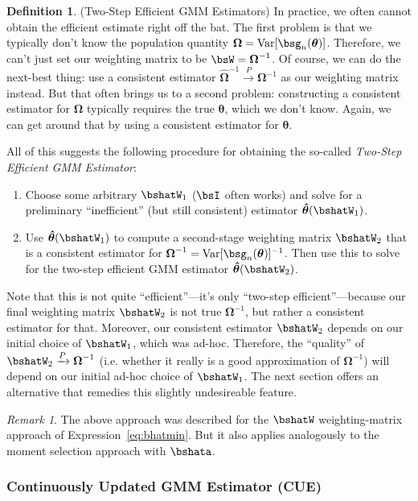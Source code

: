 \documentclass[12pt]{article}
\theoremstyle{plain}
\theoremstyle{definition}
\newtheorem{defn}[thm]{Definition}
\theoremstyle{remark}
\newtheorem*{rmk}{Remark}
\newcommand{\bstheta}{\boldsymbol{\theta}}
\newcommand{\bsOmega}{\boldsymbol{\Omega}}
\newcommand{\bshattheta}{\boldsymbol{\hat{\theta}}}
\newcommand{\bshatOmega}{\boldsymbol{\hat{\Omega}}}
\newcommand{\Var}{\operatorname{Var}}
\newcommand{\pto}{\xrightarrow{P}}
\begin{document}
\begin{defn}(Two-Step Efficient GMM Estimators)
In practice, we often cannot obtain the efficient estimate right off the
bat.
The first problem is that we typically don't know the population
quantity $\bsOmega=\Var[\bsg_n(\bstheta)]$. Therefore, we
can't just set our weighting matrix to be $\bsW=\bsOmega^{-1}$.
Of course, we can do the next-best thing: use a consistent estimator
$\bshatOmega^{-1}\pto\bsOmega^{-1}$ as our weighting matrix instead. But
that often brings us to a second problem: constructing a consistent
estimator for $\bsOmega$ typically requires the true $\bstheta$, which
we don't know. Again, we can get around that by using a consistent
estimator for $\bstheta$.

All of this suggests the following procedure for obtaining the
so-called \emph{Two-Step Efficient GMM Estimator}:
\begin{enumerate}
  \item Choose some arbitrary $\bshatW_1$ ($\bsI$ often works) and solve
    for a preliminary ``inefficient'' (but still consistent) estimator
    $\bshattheta(\bshatW_1)$.
  \item Use $\bshattheta(\bshatW_1)$ to compute a second-stage weighting
    matrix $\bshatW_2$ that is a consistent estimator for
    $\bsOmega^{-1}=\Var[\bsg_n(\bstheta)]^{-1}$. Then use this to solve
    for the two-step efficient GMM estimator $\bshattheta(\bshatW_2)$.
\end{enumerate}
Note that this is not quite ``efficient''---it's only ``two-step
efficient''---because our final weighting matrix $\bshatW_2$ is not
true $\bsOmega^{-1}$, but rather a consistent estimator for that.
Moreover, our consistent estimator $\bshatW_2$ depends on our initial
choice of $\bshatW_1$, which was ad-hoc. Therefore, the ``quality'' of
$\bshatW_2\pto\bsOmega^{-1}$ (i.e. whether it really is a good
approximation of $\bsOmega^{-1}$) will depend on our initial ad-hoc
choice of $\bshatW_1$. The next section offers an alternative that
remedies this slightly undesireable feature.
\end{defn}
\begin{rmk}
The above approach was described for the $\bshatW$ weighting-matrix
approach of Expression~\ref{eq:bhatmin}. But it also applies analogously
to the moment selection approach with $\bshata$.
\end{rmk}


\clearpage
\subsubsection{Continuously Updated GMM Estimator (CUE)}
\end{document}
